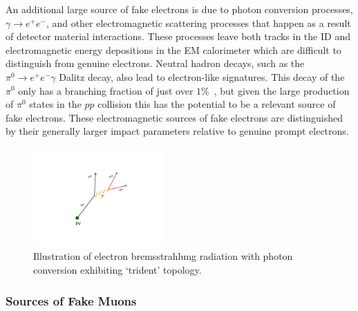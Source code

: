 An additional large source of fake electrons is due to photon conversion processes,
$\gamma \rightarrow e^+ e^-$, and other electromagnetic scattering processes
that happen as a result of detector material interactions.
These processes leave both tracks in the ID and electromagnetic energy depositions
in the EM calorimeter which are difficult to distinguish from genuine electrons.
Neutral hadron decays, such as the $\pi^0 \rightarrow e^+ e^- \gamma$ Dalitz decay,
also lead to electron-like signatures.
This decay of the $\pi^0$ only has a branching fraction of just over $1\%$~\cite{PDGRef}, but given
the large production of $\pi^0$ states in the $pp$ collision this has the potential to be
a relevant source of fake electrons.
These electromagnetic sources of fake electrons are distinguished by their generally
larger impact parameters relative to genuine prompt electrons.

\begin{figure}[!htb]
    \begin{center}
        \includegraphics[width=0.45\textwidth]{figures/common_ana/fakes/electron_brem_fake}
        \caption{
            Illustration of electron bremsstrahlung radiation with photon conversion exhibiting
            `trident' topology.
        }
        \label{fig:electron_brem_fake}
    \end{center}
\end{figure}


%
%
\subsubsection{Sources of Fake Muons}
\label{sec:fake_muon_sources}

